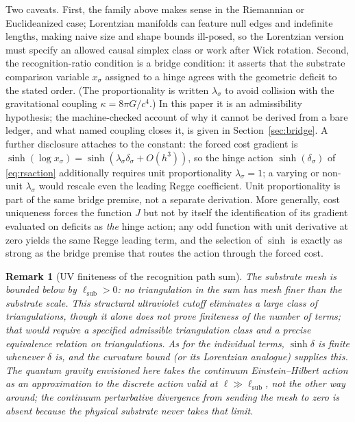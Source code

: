 \documentclass[11pt,letterpaper]{article}
\newtheorem{remark}[theorem]{Remark}
\begin{document}
Two caveats. First, the family above makes sense in the Riemannian or Euclideanized case; Lorentzian manifolds can feature null edges and indefinite lengths, making naive size and shape bounds ill-posed, so the Lorentzian version must specify an allowed causal simplex class or work after Wick rotation. Second, the recognition-ratio condition is a bridge condition: it asserts that the substrate comparison variable $x_{\sigma}$ assigned to a hinge agrees with the geometric deficit to the stated order. (The proportionality is written $\lambda_{\sigma}$ to avoid collision with the gravitational coupling $\kappa=8\pi G/c^{4}$.) In this paper it is an admissibility hypothesis; the machine-checked account of why it cannot be derived from a bare ledger, and what named coupling closes it, is given in Section~\ref{sec:bridge}. A further disclosure attaches to the constant: the forced cost gradient is $\sinh(\log x_{\sigma})=\sinh(\lambda_{\sigma}\delta_{\sigma}+O(h^{3}))$, so the hinge action $\sinh(\delta_{\sigma})$ of \eqref{eq:rsaction} additionally requires unit proportionality $\lambda_{\sigma}=1$; a varying or non-unit $\lambda_{\sigma}$ would rescale even the leading Regge coefficient. Unit proportionality is part of the same bridge premise, not a separate derivation. More generally, cost uniqueness forces the function $J$ but not by itself the identification of its gradient evaluated on deficits as \emph{the} hinge action; any odd function with unit derivative at zero yields the same Regge leading term, and the selection of $\sinh$ is exactly as strong as the bridge premise that routes the action through the forced cost.

\begin{remark}[UV finiteness of the recognition path sum]
The substrate mesh is bounded below by $\ell_{\mathrm{sub}}>0$: no triangulation in the sum has mesh finer than the substrate scale. This structural ultraviolet cutoff eliminates a large class of triangulations, though it alone does not prove finiteness of the number of terms; that would require a specified admissible triangulation class and a precise equivalence relation on triangulations. As for the individual terms, $\sinh\delta$ is finite whenever $\delta$ is, and the curvature bound (or its Lorentzian analogue) supplies this. The quantum gravity envisioned here takes the continuum Einstein--Hilbert action as an approximation to the discrete action valid at $\ell\gg\ell_{\mathrm{sub}}$, not the other way around; the continuum perturbative divergence from sending the mesh to zero is absent because the physical substrate never takes that limit.
\end{remark}
\end{document}
